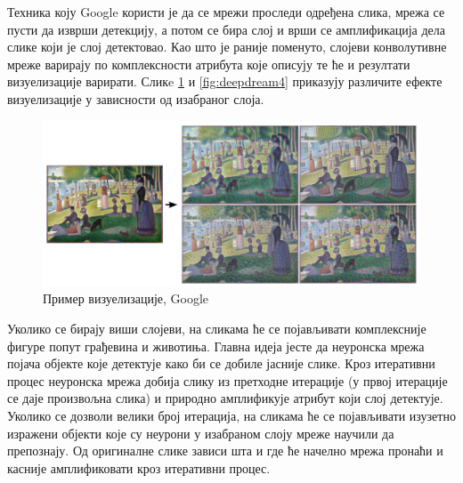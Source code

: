 \documentclass[a4paper]{article}
\begin{document}
Техника коју Google користи је да се мрежи проследи одређена слика,
мрежа се пусти да изврши детекцију, а потом се бира слој и врши се
амплификација дела слике који је слој детектовао. Као што је раније поменуто,
слојеви конволутивне мреже варирају по комплексности атрибута које описују
те ће и резултати визуелизације варирати. Сликe \ref{fig:deepdream3} и \ref{fig:deepdream4} приказују
различите ефекте визуелизације у зависности од изабраног слоја.

\begin{figure}[h!]
\begin{center}
    \includegraphics[width=\textwidth]{./resources/deepdream3.png}
\end{center}
\caption{Пример визуелизације, Google}
\label{fig:deepdream3}
\end{figure}

Уколико се бирају виши слојеви, на сликама ће се појављивати комплексније фигуре попут грађевина и животиња.
Главна идеја јесте да неуронска мрежа појача објекте које детектује како би се добиле јасније слике. Кроз итеративни процес
неуронска мрежа добија слику из претходне итерације (у првој итерације се даје произвољна слика) и природно амплификује
атрибут који слој детектује. Уколико се дозволи велики број итерација, на сликама ће се појављивати изузетно
изражени објекти које су неурони у изабраном слоју мреже научили да препознају. Од оригиналне слике зависи
шта и где ће начелно мрежа пронаћи и касније амплификовати кроз итеративни процес.
\end{document}
